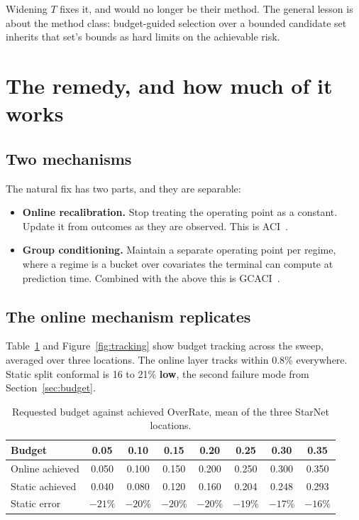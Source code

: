\documentclass[acmsmall,screen]{acmart}
\begin{document}
Widening $T$ fixes it, and would no longer be their method. The general lesson is about the method class: budget-guided selection over a bounded candidate set inherits that set's bounds as hard limits on the achievable risk.

\section{The remedy, and how much of it works}

\subsection{Two mechanisms}

The natural fix has two parts, and they are separable:
\begin{itemize}
\item \textbf{Online recalibration.} Stop treating the operating point as a constant. Update it from outcomes as they are observed. This is ACI~\cite{gibbs2021adaptive}.
\item \textbf{Group conditioning.} Maintain a separate operating point per regime, where a regime is a bucket over covariates the terminal can compute at prediction time. Combined with the above this is GCACI~\cite{ramalingam2025noregret}.
\end{itemize}

\subsection{The online mechanism replicates}
\label{sec:online}

Table~\ref{tab:tracking} and Figure~\ref{fig:tracking} show budget tracking across the sweep, averaged over three locations. The online layer tracks within 0.8\% everywhere. Static split conformal is 16 to 21\% \textbf{low}, the second failure mode from Section~\ref{sec:budget}.

\begin{table}[t]
\caption{Requested budget against achieved OverRate, mean of the three StarNet locations.}
\label{tab:tracking}
\begin{tabular}{lccccccc}
\toprule
Budget & 0.05 & 0.10 & 0.15 & 0.20 & 0.25 & 0.30 & 0.35 \\
\midrule
Online achieved & 0.050 & 0.100 & 0.150 & 0.200 & 0.250 & 0.300 & 0.350 \\
Static achieved & 0.040 & 0.080 & 0.120 & 0.160 & 0.204 & 0.248 & 0.293 \\
Static error & $-21\%$ & $-20\%$ & $-20\%$ & $-20\%$ & $-19\%$ & $-17\%$ & $-16\%$ \\
\bottomrule
\end{tabular}
\end{table}
\end{document}
